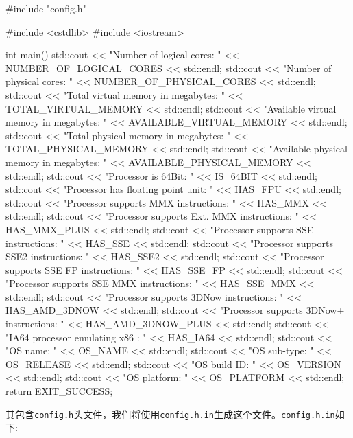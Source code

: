 \begin{codebox}[cpp]
#include "config.h"

#include <cstdlib>
#include <iostream>

int main()
{
  std::cout << "Number of logical cores: "
            << NUMBER_OF_LOGICAL_CORES << std::endl;
  std::cout << "Number of physical cores: "
            << NUMBER_OF_PHYSICAL_CORES << std::endl;
  std::cout << "Total virtual memory in megabytes: "
            << TOTAL_VIRTUAL_MEMORY << std::endl;
  std::cout << "Available virtual memory in megabytes: "
            << AVAILABLE_VIRTUAL_MEMORY << std::endl;
  std::cout << "Total physical memory in megabytes: "
            << TOTAL_PHYSICAL_MEMORY << std::endl;
  std::cout << "Available physical memory in megabytes: "
            << AVAILABLE_PHYSICAL_MEMORY << std::endl;
  std::cout << "Processor is 64Bit: "
            << IS_64BIT << std::endl;
  std::cout << "Processor has floating point unit: "
            << HAS_FPU << std::endl;
  std::cout << "Processor supports MMX instructions: "
            << HAS_MMX << std::endl;
  std::cout << "Processor supports Ext. MMX instructions: "
            << HAS_MMX_PLUS << std::endl;
  std::cout << "Processor supports SSE instructions: "
            << HAS_SSE << std::endl;
  std::cout << "Processor supports SSE2 instructions: "
            << HAS_SSE2 << std::endl;
  std::cout << "Processor supports SSE FP instructions: "
            << HAS_SSE_FP << std::endl;
  std::cout << "Processor supports SSE MMX instructions: "
            << HAS_SSE_MMX << std::endl;
  std::cout << "Processor supports 3DNow instructions: "
            << HAS_AMD_3DNOW << std::endl;
  std::cout << "Processor supports 3DNow+ instructions: "
            << HAS_AMD_3DNOW_PLUS << std::endl;
  std::cout << "IA64 processor emulating x86 : "
            << HAS_IA64 << std::endl;
  std::cout << "OS name: "
            << OS_NAME << std::endl;
  std::cout << "OS sub-type: "
            << OS_RELEASE << std::endl;
  std::cout << "OS build ID: "
            << OS_VERSION << std::endl;
  std::cout << "OS platform: "
            << OS_PLATFORM << std::endl;
  return EXIT_SUCCESS;
}
\end{codebox}

其包含\texttt{config.h}头文件，我们将使用\texttt{config.h.in}生成这个文件。\texttt{config.h.in}如下:

